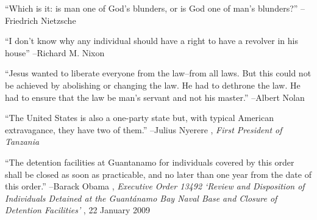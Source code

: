 \documentclass{article}%
\begin{document}
\linebreak%
\vspace{1mm}%
\begin{minipage}{\textwidth}%
\flushleft%
“Which is it: is man one of God's blunders, or is God one of man's blunders?”%
\linebreak%
\vspace{1mm}%
–Friedrich Nietzsche%
\linebreak%
\vspace{1mm}%
\end{minipage}%
\linebreak%
\vspace{1mm}%
\begin{minipage}{\textwidth}%
\flushleft%
“I don't know why any individual should have a right to have a revolver in his house”%
\linebreak%
\vspace{1mm}%
–Richard M. Nixon%
\linebreak%
\vspace{1mm}%
\end{minipage}%
\linebreak%
\vspace{1mm}%
\begin{minipage}{\textwidth}%
\flushleft%
“Jesus wanted to liberate everyone from the law–from all laws. But this could not be achieved by abolishing or changing the law. He had to dethrone the law. He had to ensure that the law be man's servant and not his master.”%
\linebreak%
\vspace{1mm}%
–Albert Nolan%
\linebreak%
\vspace{1mm}%
\end{minipage}%
\linebreak%
\vspace{1mm}%
\begin{minipage}{\textwidth}%
\flushleft%
“The United States is also a one{-}party state but, with typical American extravagance, they have two of them.”%
\linebreak%
\vspace{1mm}%
–Julius Nyerere%
, \textit{First President of Tanzania}%
\linebreak%
\vspace{1mm}%
\end{minipage}%
\linebreak%
\vspace{1mm}%
\begin{minipage}{\textwidth}%
\flushleft%
“The detention facilities at Guantanamo for individuals covered by this order shall be closed as soon as practicable, and no later than one year from the date of this order.”%
\linebreak%
\vspace{1mm}%
–Barack Obama%
, \textit{Executive Order 13492 ‘Review and Disposition of Individuals Detained at the Guantánamo Bay Naval Base and Closure of Detention Facilities’}%
, 22 January 2009%
\linebreak%
\vspace{1mm}%
\end{minipage}%
\end{document}
